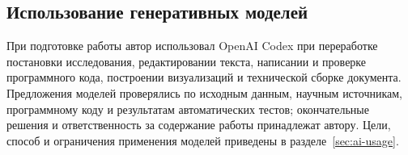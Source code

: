 \subsection{Использование генеративных моделей}

При подготовке работы автор использовал OpenAI Codex при переработке постановки исследования, редактировании текста, написании и проверке программного кода, построении визуализаций и технической сборке документа. Предложения моделей проверялись по исходным данным, научным источникам, программному коду и результатам автоматических тестов; окончательные решения и ответственность за содержание работы принадлежат автору. Цели, способ и ограничения применения моделей приведены в разделе~\ref{sec:ai-usage}.
\clearpage
